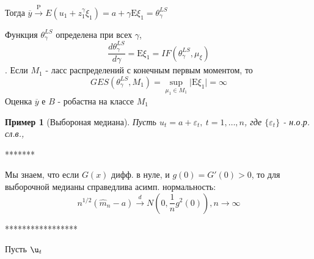 \documentclass[12pt]{article}
\newtheorem*{example}{Пример}
\theoremstyle{basic_theorem}
\theoremstyle{name_theorem}
\def\eps{
    \varepsilon
}
\def\E{
    \mathrm{E}
}
\def\P{
    \mathrm{P}
}
\begin{document}
    Тогда $\overline{y}\xrightarrow{\P}E(u_1+z_1^\gamma\xi_1) = a + \gamma\E\xi_1=\theta^{LS}_\gamma$

    Функция $\theta_\gamma^{LS}$ определена при всех $\gamma$,
    $$\frac{d\theta_\gamma^{LS}}{d\gamma}=\E\xi_1=IF(\theta_\gamma^{LS}, \mu_\xi)$$.
    Если $M_1$ - ласс распределений с конечным первым моментом, то
    $$GES(\theta_\gamma^{LS}, M_1) = \sup_{\mu_1\in M_1} \vert\E\xi_1\vert = \infty$$
    Оценка $\overline{y}$ е $B$ - робастна на  классе $M_1$

    \begin{example}[Выбороная медиана]
        Пусть $u_t = a+\eps_t,\ t=1,\ldots,n$, где
        $\{\eps_t\}$ - н.о.р. сл.в.,
    \end{example}
    *******

    Мы знаем, что если $G(x)$ дифф. в нуле, и $g(0) = G'(0)>0$,
    то для выборочной медианы справедлива асимп. нормальность:
    $$n^{1/2}(\hat{m}_n - a)\xrightarrow{d}N(0, \frac{1}{n}g^2(0)), n\rightarrow\infty$$
    
    *****************

    Пусть $\u_t$
\end{document}
